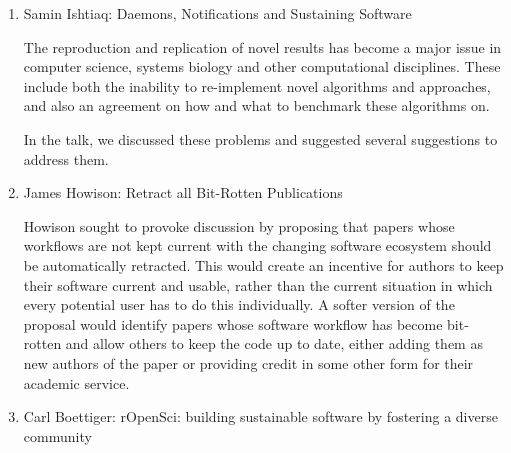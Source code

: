 \documentclass[11pt, oneside]{amsart}
\begin{document}
\begin{enumerate}



\item Samin Ishtiaq: Daemons, Notifications and Sustaining Software

The reproduction and replication of novel results has become a major issue in
computer science, systems biology and other computational disciplines. These
include both the inability to re-implement novel algorithms and approaches, and
also an agreement on how and what to benchmark these algorithms on.

In the talk, we discussed these problems and suggested several suggestions to
address them.

\item James Howison: Retract all Bit-Rotten Publications

Howison sought to provoke discussion by proposing that papers whose workflows are
not kept current with the changing software ecosystem should be automatically
retracted. This would create an incentive for authors to keep their
software current and usable, rather than the current situation in which every
potential user has to do this individually. A softer version of the proposal
would identify papers whose software workflow has become bit-rotten and allow
others to keep the code up to date, either adding them as new authors of the
paper or providing credit in some other form for their academic service.





\item Carl Boettiger: rOpenSci: building sustainable software by fostering a
diverse community


\end{enumerate}
\end{document}
